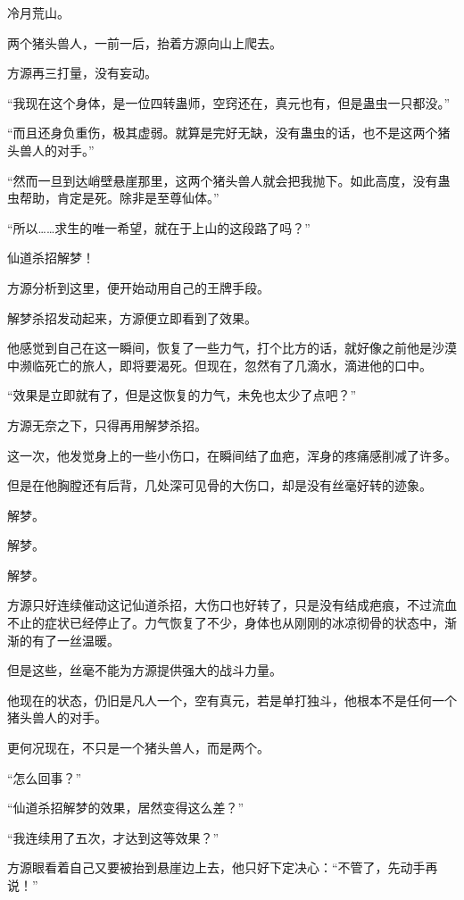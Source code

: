 
\begin{this_body}

冷月荒山。

两个猪头兽人，一前一后，抬着方源向山上爬去。

方源再三打量，没有妄动。

“我现在这个身体，是一位四转蛊师，空窍还在，真元也有，但是蛊虫一只都没。”

“而且还身负重伤，极其虚弱。就算是完好无缺，没有蛊虫的话，也不是这两个猪头兽人的对手。”

“然而一旦到达峭壁悬崖那里，这两个猪头兽人就会把我抛下。如此高度，没有蛊虫帮助，肯定是死。除非是至尊仙体。”

“所以……求生的唯一希望，就在于上山的这段路了吗？”

仙道杀招解梦！

方源分析到这里，便开始动用自己的王牌手段。

解梦杀招发动起来，方源便立即看到了效果。

他感觉到自己在这一瞬间，恢复了一些力气，打个比方的话，就好像之前他是沙漠中濒临死亡的旅人，即将要渴死。但现在，忽然有了几滴水，滴进他的口中。

“效果是立即就有了，但是这恢复的力气，未免也太少了点吧？”

方源无奈之下，只得再用解梦杀招。

这一次，他发觉身上的一些小伤口，在瞬间结了血疤，浑身的疼痛感削减了许多。

但是在他胸膛还有后背，几处深可见骨的大伤口，却是没有丝毫好转的迹象。

解梦。

解梦。

解梦。

方源只好连续催动这记仙道杀招，大伤口也好转了，只是没有结成疤痕，不过流血不止的症状已经停止了。力气恢复了不少，身体也从刚刚的冰凉彻骨的状态中，渐渐的有了一丝温暖。

但是这些，丝毫不能为方源提供强大的战斗力量。

他现在的状态，仍旧是凡人一个，空有真元，若是单打独斗，他根本不是任何一个猪头兽人的对手。

更何况现在，不只是一个猪头兽人，而是两个。

“怎么回事？”

“仙道杀招解梦的效果，居然变得这么差？”

“我连续用了五次，才达到这等效果？”

方源眼看着自己又要被抬到悬崖边上去，他只好下定决心：“不管了，先动手再说！”


\end{this_body}
